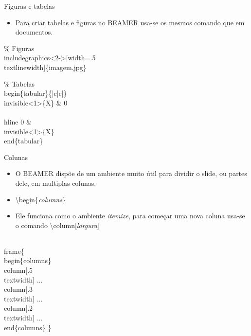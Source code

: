 \begin{frame}[fragile]{Figuras e tabelas}
    \begin{itemize}
    \item Para criar tabelas e figuras no {\footnotesize BEAMER} usa-se os mesmos comando que em documentos.
    \end{itemize}

    \begin{example}
\begin{semiverbatim}
\small \% Figuras
\\includegraphics<2->[width=.5\\textlinewidth]\{imagem.jpg\}

\% Tabelas
\\begin\{tabular\}\{|c|c|\}
    \\invisible<1>\{X\} \& 0 \\
    \\hline
    0 \& \\invisible<1>\{X\}
\\end\{tabular\}
\end{semiverbatim}
    \end{example}

\end{frame}

\begin{frame}[fragile]{Colunas}
    \begin{itemize}
    \item O {\footnotesize BEAMER} dispõe de um ambiente muito útil para dividir o slide, ou partes dele, em multiplas colunas.
    \item[] \alert{\textbackslash begin\{\textit{columns}\}}
    \item Ele funciona como o ambiente \textit{itemize}, para começar uma nova coluna usa-se o comando \alert{\textbackslash column[\textit{largura}]}
    \end{itemize}

    \begin{example}
    \begin{semiverbatim}
    \footnotesize\\frame\{
        \\begin\{columns\}
        \\column[.5\\textwidth]
        ...
        \\column[.3\\textwidth]
        ...
        \\column[.2\\textwidth]
        ...
        \\end\{columns\}
    \}
\end{semiverbatim}
    \end{example}
\end{frame}

